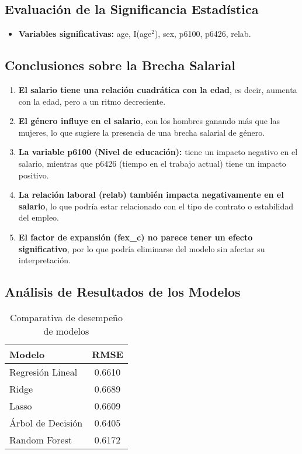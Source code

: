 \documentclass[12pt,a4paper,onecolumn]{article}
\begin{document}
\subsection{Evaluación de la Significancia Estadística}

\begin{itemize}
    \item \textbf{Variables significativas:} age, I(age$^2$), sex, p6100, p6426, relab.
\end{itemize}

\subsection{Conclusiones sobre la Brecha Salarial}

\begin{enumerate}
    \item \textbf{El salario tiene una relación cuadrática con la edad}, es decir, aumenta con la edad, pero a un ritmo decreciente.

    \item \textbf{El género influye en el salario}, con los hombres ganando más que las mujeres, lo que sugiere la presencia de una brecha salarial de género.

    \item \textbf{La variable p6100 (Nivel de educación):} tiene un impacto negativo en el salario, mientras que p6426 (tiempo en el trabajo actual) tiene un impacto positivo.

    \item \textbf{La relación laboral (relab) también impacta negativamente en el salario}, lo que podría estar relacionado con el tipo de contrato o estabilidad del empleo.

    \item \textbf{El factor de expansión (fex\_c) no parece tener un efecto significativo}, por lo que podría eliminarse del modelo sin afectar su interpretación.
\end{enumerate}

\subsection{Análisis de Resultados de los Modelos}

\begin{table}[htbp]
    \centering
    \caption{Comparativa de desempeño de modelos}
    \label{tab:model_performance}
    \begin{tabular}{lc}
    \toprule
    \textbf{Modelo} & \textbf{RMSE} \\
    \midrule
    Regresión Lineal & 0.6610 \\
    Ridge & 0.6689 \\
    Lasso & 0.6609 \\
    Árbol de Decisión & 0.6405 \\
    Random Forest & 0.6172 \\
    \bottomrule
    \end{tabular}
\end{table}
\end{document}

